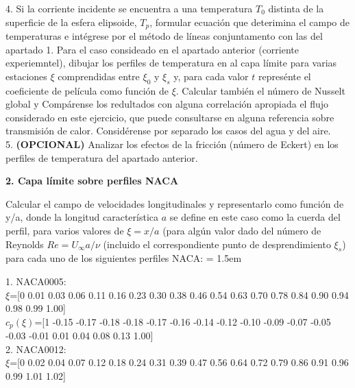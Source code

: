 \documentclass[11pt,a4paper]{article}
\begin{document}

4. Si la corriente incidente se encuentra a una temperatura $T_{0}$ distinta de la superficie de la esfera elipsoide, $T_{p}$, formular ecuación que deterimina el campo de temperaturas e intégrese por el método de líneas conjuntamento con las del apartado 1. Para el caso consideado en el apartado anterior (corriente experiemntel), dibujar los perfiles de temperatura en al capa límite para varias estaciones $\xi$ comprendidas entre $\xi_{0}$ y $\xi_{s}$ y, para cada valor $t$ represénte el coeficiente de película como función de $\xi$. Calcular también el número de Nusselt global y Compárense los redultados con alguna correlación apropiada el flujo considerado en este ejercicio, que puede consultarse en alguna referencia sobre transmisión de calor. Considérense por separado los casos del agua y del aire.
\\


5. \textbf{(OPCIONAL)} Analizar los efectos de la fricción (número de Eckert) en los perfiles de temperatura del apartado anterior.



\begin{center}
{\Large  \textbf {2. Capa límite sobre perfiles NACA}}
\end{center}


Calcular el campo de velocidades longitudinales y representarlo como función de y/a, donde la longitud característica $a$ se define en este caso como la cuerda del perfil, para varios valores de $\xi=x/a$ (para algún valor dado del número de Reynolds $Re=U_{\infty} a/\nu$ (incluido el correspondiente punto de desprendimiento $\xi_{s}$) para cada uno de los siguientes perfiles NACA:
\font= 1.5em

\vspace{1cm}
1. NACA0005:
\\

\hspace{1cm}
$\xi$=[0 0.01 0.03 0.06 0.11 0.16 0.23 0.30 0.38 0.46 0.54 0.63 0.70 0.78 0.84 0.90 0.94 0.98 0.99 1.00]
\\

$c_{p}(\xi)$=[1 -0.15 -0.17 -0.18 -0.18 -0.17 -0.16 -0.14 -0.12 -0.10 -0.09 -0.07 -0.05 -0.03 -0.01 0.01 0.04 0.08 0.13 1.00]
\\

2. NACA0012:
\\
\hspace{1cm}
$\xi$=[0 0.02 0.04 0.07 0.12 0.18 0.24 0.31 0.39 0.47 0.56 0.64 0.72 0.79 0.86 0.91 0.96 0.99 1.01 1.02]
\\
\end{document}
